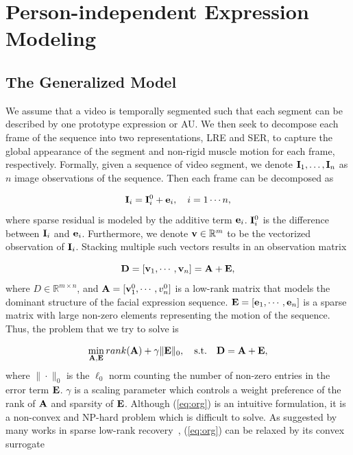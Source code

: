 \documentclass[journal]{IEEEtran}
\begin{document}
\section{Person-independent Expression Modeling\label{sec:decompose}}

\subsection{The Generalized Model} 
We assume that a video is temporally segmented such that each segment can be described by one prototype expression or AU. We then seek to decompose each frame of the sequence into two representations, LRE and SER, to capture the global appearance of the segment and non-rigid muscle motion for each frame, respectively. Formally, given a sequence of video segment, we denote ${\bf I}_1, \ldots, {\bf I}_n$ as $n$ image observations of the sequence. Then each frame can be decomposed as

\begin{equation}
{\bf I}_i = {\bf I}^{0}_i + {\bf e}_i,\quad i = 1\cdots n,
\end{equation}
where sparse residual is modeled by the additive term ${\bf e}_i$. ${\bf I}^{0}_i$ is the difference between ${\bf I}_i$ and ${\bf e}_i$. Furthermore, we denote ${\bf v}\in\mathbb{R}^{m}$ to be the vectorized observation of ${\bf I}_i$. Stacking multiple such vectors results in an observation matrix

\begin{equation}
{\bf D} = [{\bf v}_1,  \cdots, {\bf v}_n] = {\bf A} + {\bf E},
\end{equation}
where $D\in\mathbb{R}^{m\times n}$, and ${\bf A} = [{\bf v}^{0}_{1}, \cdots, v^{0}_{n}]$ is a low-rank matrix that models the dominant structure of the facial expression sequence. ${\bf E} = [{\bf e}_{1}, \cdots, {\bf e}_{n}]$ is a sparse matrix with large non-zero elements representing the motion of the sequence. Thus, the problem that we try to solve is

\begin{equation} \label{eq:org}
\min_{\A,\E} rank(\A)+\gamma \|\E\|_0,  \quad \text{s.t.} \quad \D = \A + \E, 
\end{equation}
where $\|\cdot\|_0$ is the $\ell_0$ norm counting the number of non-zero entries in the error term ${\bf E}$. $\gamma$ is a scaling parameter which controls a weight preference of the rank of ${\bf A}$ and sparsity of ${\bf E}$. Although (\ref{eq:org}) is an intuitive formulation, it is a non-convex and NP-hard problem which is difficult to solve. As suggested by many works in sparse low-rank recovery~\cite{Candes11,Lin09,Peng_CVPR10}, (\ref{eq:org}) can be relaxed by its convex surrogate
\end{document}
